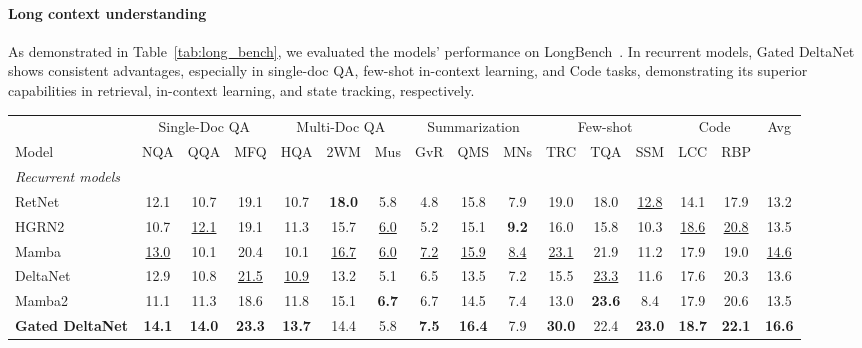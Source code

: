 \documentclass{article}
\begin{document}
\paragraph{Long context understanding} As demonstrated in Table~\ref{tab:long_bench}, we evaluated the models' performance on LongBench~\citep{bai2023longbench}. In recurrent models, Gated DeltaNet shows consistent advantages, especially in single-doc QA, few-shot in-context learning, and Code tasks,  demonstrating its superior capabilities in retrieval, in-context learning, and state tracking, respectively.

\begin{table}[t]
\centering
\setlength{\tabcolsep}{3.5pt}  
\scriptsize  
\begin{tabular}{l|ccc|ccc|ccc|ccc|cc|c}
\toprule
& \multicolumn{3}{c|}{{Single-Doc QA}} & \multicolumn{3}{c|}{Multi-Doc QA} & \multicolumn{3}{c|}{Summarization} & \multicolumn{3}{c|}{Few-shot} & \multicolumn{2}{c|}{Code} & Avg \\
 Model & {\tiny NQA} & {\tiny QQA} & {\tiny MFQ} 
          & {\tiny HQA} & {\tiny 2WM} & {\tiny Mus} 
          & {\tiny GvR} & {\tiny QMS} & {\tiny MNs}
          & {\tiny TRC} & {\tiny TQA} & {\tiny SSM} 
          & {\tiny LCC} & {\tiny RBP} &  \\\midrule
\textit{Recurrent models}\\
RetNet & 12.1 & 10.7 & 19.1 & 10.7 & \textbf{18.0} & 5.8 & 4.8 & 15.8 & 7.9 & 19.0 & 18.0 & \underline{12.8} & 14.1 & 17.9 & 13.2 \\
HGRN2 & 10.7 & \underline{12.1} & 19.1 & 11.3 & 15.7 & \underline{6.0} & 5.2 & 15.1 & \textbf{9.2} & 16.0 & 15.8 & 10.3 & \underline{18.6} & \underline{20.8} & 13.5 \\
Mamba & \underline{13.0} & 10.1 & 20.4 & 10.1 & \underline{16.7} & \underline{6.0} & \underline{7.2} & \underline{15.9} & \underline{8.4} & \underline{23.1} & 21.9 & 11.2 & 17.9 & 19.0 & \underline{14.6} \\
DeltaNet & 12.9 & 10.8 & \underline{21.5} & \underline{10.9} & 13.2 & 5.1 & 6.5 & 13.5 & 7.2 & 15.5 & \underline{23.3} & {11.6} & 17.6 & 20.3 & 13.6 \\
Mamba2 & 11.1 & 11.3 & 18.6 & 11.8 & 15.1 & \textbf{6.7} & {6.7} & 14.5 & 7.4 & 13.0 & \textbf{23.6} & 8.4 & 17.9 & 20.6 & 13.5 \\
\textbf{Gated DeltaNet} & \textbf{14.1} & \textbf{14.0} & \textbf{23.3} & \textbf{13.7} & 14.4 & 5.8 & \textbf{7.5} & \textbf{16.4} & 7.9 & \textbf{30.0} & 22.4 & \textbf{23.0} & \textbf{18.7} & \textbf{22.1} & \textbf{16.6} \\

\end{tabular}
\end{table}
\end{document}
